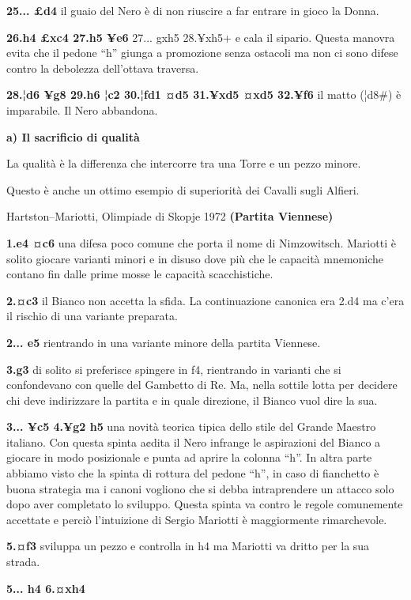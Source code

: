 \textbf{25... £d4} il guaio del Nero è di non riuscire a far entrare in
gioco la Donna.

\textbf{26.h4 £xc4 27.h5 ¥e6} 27... gxh5 28.¥xh5+ e cala il sipario.
Questa manovra evita che il pedone ``h'' giunga a promozione senza
ostacoli ma non ci sono difese contro la debolezza dell'ottava traversa.

\textbf{28.¦d6 ¥g8 29.h6 ¦c2 30.¦fd1 ¤d5 31.¥xd5 ¤xd5 32.¥f6} il matto
(¦d8\#) è imparabile. Il Nero abbandona.

\textbf{a) Il sacrificio di qualità}

La qualità è la differenza che intercorre tra una Torre e un pezzo
minore.

Questo è anche un ottimo esempio di superiorità dei Cavalli sugli
Alfieri.

Hartston--Mariotti, Olimpiade di Skopje 1972 \textbf{(Partita Viennese)}

\textbf{1.e4 ¤c6} una difesa poco comune che porta il nome di
Nimzowitsch. Mariotti è solito giocare varianti minori e in disuso dove
più che le capacità mnemoniche contano fin dalle prime mosse le capacità
scacchistiche.

\textbf{2.¤c3} il Bianco non accetta la sfida. La continuazione canonica
era 2.d4 ma c'era il rischio di una variante preparata.

\textbf{2... e5} rientrando in una variante minore della partita
Viennese.

\textbf{3.g3} di solito si preferisce spingere in f4, rientrando in
varianti che si confondevano con quelle del Gambetto di Re. Ma, nella
sottile lotta per decidere chi deve indirizzare la partita e in quale
direzione, il Bianco vuol dire la sua.

\textbf{3... ¥c5 4.¥g2 h5} una novità teorica tipica dello stile del
Grande Maestro italiano. Con questa spinta a¢dita il Nero infrange le
aspirazioni del Bianco a giocare in modo posizionale e punta ad aprire
la colonna ``h''. In altra parte abbiamo visto che la spinta di rottura
del pedone ``h'', in caso di fianchetto è buona strategia ma i canoni
vogliono che si debba intraprendere un attacco solo dopo aver completato
lo sviluppo. Questa spinta va contro le regole comunemente accettate e
perciò l'intuizione di Sergio Mariotti è maggiormente rimarchevole.

\textbf{5.¤f3} sviluppa un pezzo e controlla in h4 ma Mariotti va dritto
per la sua strada.

\textbf{5... h4 6.¤xh4}


